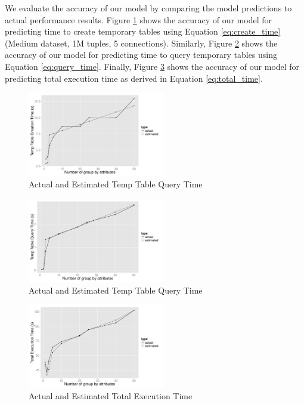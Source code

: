 We evaluate the accuracy of our model by comparing the model predictions to
actual performance results. Figure \ref{fig:create_time_fitted} shows the
accuracy of our model for predicting time to create temporary tables using
Equation \ref{eq:create_time} (Medium dataset, 1M tuples, 5 connections).
Similarly, Figure \ref{fig:query_time_fitted} shows the accuracy of our model
for predicting time to query temporary tables using Equation
\ref{eq:query_time}. Finally, Figure \ref{fig:total_time_fitted} shows the
accuracy of our model for predicting total execution time as derived in Equation
\ref{eq:total_time}.

\begin{figure}[h]
  \centering
    \includegraphics[width=6cm]{Images/create_time_fitted.pdf}
  \caption{Actual and Estimated Temp Table Query Time}
  \label{fig:create_time_fitted}
  
\end{figure}
\begin{figure}[h]
  \centering
    \includegraphics[width=6cm]{Images/query_time_fitted.pdf}
  \caption{Actual and Estimated Temp Table Query Time} 
  \label{fig:query_time_fitted}
\end{figure}

\begin{figure}[h]
  \centering
    \includegraphics[width=6cm]{Images/total_time_fitted.pdf}
  \caption{Actual and Estimated Total Execution Time} 
    \label{fig:total_time_fitted}
\end{figure}

